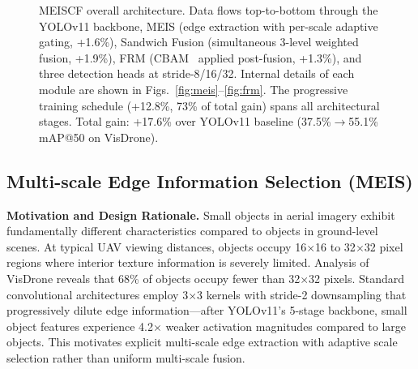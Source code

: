 \documentclass[preprint,12pt]{elsarticle}
\begin{document}
\begin{figure}[H]
{
}
\caption{MEISCF overall architecture. Data flows top-to-bottom through the
YOLOv11 backbone, MEIS (edge extraction with per-scale adaptive gating, +1.6\%),
Sandwich Fusion (simultaneous 3-level weighted fusion, +1.9\%), FRM
(CBAM~\cite{cbam} applied post-fusion, +1.3\%), and three detection heads at
stride-8/16/32. Internal details of each module are shown in
Figs.~\ref{fig:meis}--\ref{fig:frm}. The progressive training schedule (+12.8\%,
73\% of total gain) spans all architectural stages. Total gain: +17.6\% over
YOLOv11 baseline (37.5\%$\to$55.1\% mAP@50 on VisDrone).}
\label{fig:architecture}
\end{figure}

\subsection{Multi-scale Edge Information Selection (MEIS)}

\textbf{Motivation and Design Rationale.}
Small objects in aerial imagery exhibit fundamentally different characteristics
compared to objects in ground-level scenes. At typical UAV viewing distances,
objects occupy 16$\times$16 to 32$\times$32 pixel regions where interior texture
information is severely limited. Analysis of VisDrone reveals that 68\% of
objects occupy fewer than 32$\times$32 pixels. Standard convolutional
architectures employ 3$\times$3 kernels with stride-2 downsampling that
progressively dilute edge information---after YOLOv11's 5-stage backbone, small
object features experience 4.2$\times$ weaker activation magnitudes compared to
large objects. This motivates explicit multi-scale edge extraction with adaptive
scale selection rather than uniform multi-scale fusion.
\end{document}
